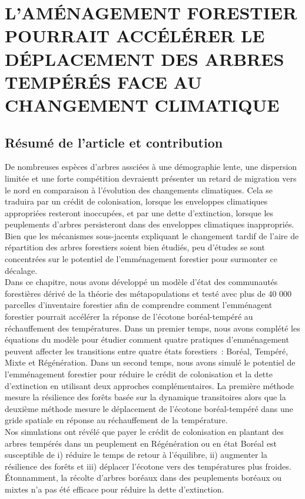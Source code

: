 \graphicspath{{chapter1/}{manuscript/}}

\chapter{\textbf{\MakeUppercase{  L'aménagement forestier pourrait
accélérer le déplacement des arbres tempérés face au changement
climatique}}}

\section{Résumé de l'article et contribution}

De nombreuses espèces d'arbres assciées à une démographie lente, une
dispersion limitée et une forte compétition devraientt présenter un
retard de migration vers le nord en comparaison à l'évolution des
changements climatiques. Cela se traduira par un crédit de colonisation,
lorsque les enveloppes climatiques appropriées resteront inoccupées, et
par une dette d'extinction, lorsque les peuplements d'arbres
persisteront dans des enveloppes climatiques inappropriés. Bien que les
mécanismes sous-jacents expliquant le changement tardif de l'aire de
répartition des arbres forestiers soient bien étudiés, peu d'études se
sont concentrées sur le potentiel de l'emménagement forestier pour
surmonter ce décalage.\\

Dans ce chapitre, nous avons développé un modèle d'état des communautés
forestières dérivé de la théorie des métapopulations et testé avec plus
de 40 000 parcelles d'inventaire forestier afin de comprendre comment
l'emménagent forestier pourrait accélérer la réponse de l'écotone
boréal-tempéré au réchauffement des températures. Dans un premier temps,
nous avons complété les équations du modèle pour étudier comment quatre
pratiques d'emménagement peuvent affecter les transitions entre quatre
états forestiers~: Boréal, Tempéré, Mixte et Régénération. Dans un
second temps, nous avons simulé le potentiel de l'emménagement forestier
pour réduire le crédit de colonisation et la dette d'extinction en
utilisant deux approches complémentaires. La première méthode mesure la
résilience des forêts basée sur la dynamique transitoires alors que la
deuxième méthode mesure le déplacement de l'écotone boréal-tempéré dans
une gride spatiale en réponse au réchauffement de la température.\\

Nos simulations ont révélé que payer le crédit de colonisation en
plantant des arbres tempérés dans un peuplement en Régénération ou en
état Boréal est susceptible de i) réduire le temps de retour à
l'équilibre, ii) augmenter la résilience des forêts et iii) déplacer
l'écotone vers des températures plus froides. Étonnamment, la récolte
d'arbres boréaux dans des peuplements boréaux ou mixtes n'a pas été
efficace pour réduire la dette d'extinction.\\

